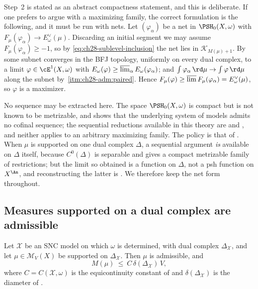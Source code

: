\begin{remark}
\label{rem:ch28-net-form}
Step~2 is stated as an abstract compactness statement, and this is
deliberate.  If one prefers to argue with a maximizing family, the correct
formulation is the following, and it must be run with nets.  Let
\((\varphi_\alpha)\) be a net in \(\PSH_0(X,\omega)\) with
\(F_\mu(\varphi_\alpha)\to E^\vee_\omega(\mu)\).  Discarding an initial
segment we may assume \(F_\mu(\varphi_\alpha)\geq-1\), so by
\eqref{eq:ch28-sublevel-inclusion} the net lies in
\(\mathcal K_{M(\mu)+1}\).  By  some subnet
converges in the BFJ topology, uniformly on every dual complex, to a limit
\(\varphi\in\cE^1(X,\omega)\) with
\(E_\omega(\varphi)\geq\varlimsup_\alpha E_\omega(\varphi_\alpha)\); and
\(\int\varphi_\alpha\,\rd\mu\to\int\varphi\,\rd\mu\) along the subnet by
\,\cref{itm:ch28-adm:paired}.  Hence
\(F_\mu(\varphi)\geq\varlimsup F_\mu(\varphi_\alpha)=E^\vee_\omega(\mu)\),
so \(\varphi\) is a maximizer.

No sequence may be extracted here.  The space \(\PSH_0(X,\omega)\) is
compact but is not known to be metrizable, and
 shows that the underlying system of
models admits no cofinal sequence; the sequential reductions available in
this theory are  and
, and neither applies to an arbitrary
maximizing family.  The policy is that of
.  When \(\mu\) is supported on one
dual complex \(\Delta\), a sequential argument \emph{is} available on
\(\Delta\) itself, because \(C^0(\Delta)\) is separable and
 gives a compact metrizable family of
restrictions; but the limit so obtained is a function on \(\Delta\), not a
psh function on \(X^{\An}\), and reconstructing the latter is
.  We therefore keep the net form
throughout.
\end{remark}

\subsection{Measures supported on a dual complex are admissible}
\label{sec:ch28-skeleton-admissible}

\begin{lemma}
\label{lem:ch28-skeleton-admissible}
Let \(\mathcal X\) be an SNC model on which \(\omega\) is determined, with
dual complex \(\Delta_{\mathcal X}\), and let \(\mu\in\mathcal M_V(X)\) be
supported on \(\Delta_{\mathcal X}\).  Then \(\mu\) is admissible, and
\begin{equation}
\label{eq:ch28-skeleton-M-bound}
 M(\mu)\ \leq\ C\,\delta(\Delta_{\mathcal X})\,V ,
\end{equation}
where \(C=C(\mathcal X,\omega)\) is the equicontinuity constant of
 and
\(\delta(\Delta_{\mathcal X})\) is the diameter of
.
\end{lemma}

